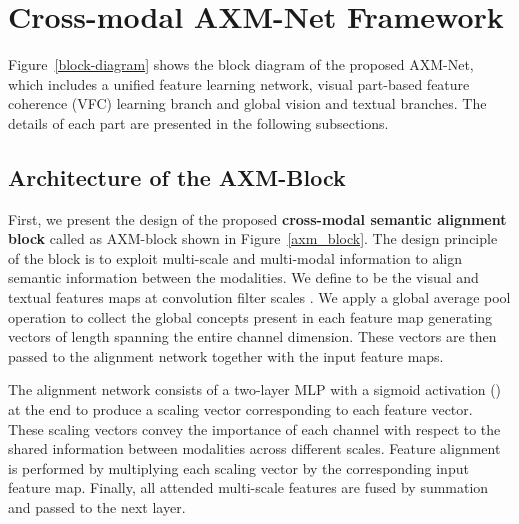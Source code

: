 \documentclass[letterpaper]{article} \usepackage{aaai22}  \usepackage{times}  \usepackage{helvet}  \usepackage{courier}  \usepackage[hyphens]{url}  \usepackage{graphicx} \urlstyle{rm} \def\UrlFont{\rm}  \usepackage{natbib}  \usepackage{caption} \DeclareCaptionStyle{ruled}{labelfont=normalfont,labelsep=colon,strut=off} \frenchspacing  \setlength{\pdfpagewidth}{8.5in}  \setlength{\pdfpageheight}{11in}  \usepackage{algorithm}
\begin{document}
\section{Cross-modal AXM-Net Framework}
Figure~\ref{block-diagram} shows the block diagram of the proposed AXM-Net, which includes a unified feature learning network, visual part-based feature coherence (VFC) learning branch and global vision and textual branches. The details of each part are presented in the following subsections.
\subsection{Architecture of the AXM-Block} 
First, we present the design of the proposed \textbf{cross-modal semantic alignment block} called as AXM-block shown in Figure~\ref{axm_block}. The design principle of the block is to exploit multi-scale and multi-modal information to align semantic information between the modalities. We define  to be the visual and textual features maps at convolution filter scales . We apply a global average pool operation to collect the global concepts present in each feature map generating  vectors of length spanning the entire channel dimension. These vectors are then passed to the alignment network together with the input feature maps.


The alignment network consists of a two-layer MLP with a sigmoid activation () at the end to produce a scaling vector  corresponding to each feature vector. These scaling vectors convey the importance of each channel with respect to the shared information between modalities across different scales. Feature alignment is performed by multiplying each scaling vector by the corresponding input feature map. Finally, all attended multi-scale features are fused by summation and passed to the next layer.
\end{document}
